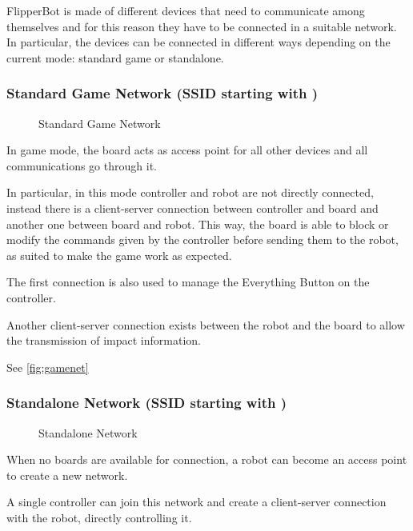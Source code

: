 
FlipperBot is made of different devices that need to communicate
among themselves and for this reason they have to be connected in a
suitable network. In particular, the devices can be connected in
different ways depending on the current mode: standard game or
standalone.

\subsubsection{Standard Game Network (SSID starting with
  )}
  \begin{figure}[htbp]
    \centering
    \resizebox{0.7\textwidth}{!}{}

    \caption{Standard Game Network}
    \label{fig:gamenet}
  \end{figure}
  In game mode, the board acts as access point for all other devices
  and all communications go through it.

  In particular, in this mode controller and robot are not directly
  connected, instead there is a client-server connection between
  controller and board and another one between board and robot. This
  way, the board is able to block or modify the commands given by
  the controller before sending them to the robot, as suited to make
  the game work as expected.

  The first connection is also used to manage the Everything Button
  on the controller.

  Another client-server connection exists between the robot and the
  board to allow the transmission of impact information.

  See \autoref{fig:gamenet}

\subsubsection{Standalone Network (SSID starting with
  )}
  \begin{figure}[htbp]
    \centering
    \resizebox{0.7\textwidth}{!}{}

    \caption{Standalone Network}
    \label{fig:robotnet}
  \end{figure}
  When no boards are available for connection, a robot can become an
  access point to create a new network.

  A single controller can join this network and create a
  client-server connection with the robot, directly controlling it.
  
